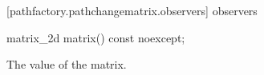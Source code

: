  [pathfactory.pathchangematrix.observers]{ observers}

\begin{itemdecl}
    matrix_2d matrix() const noexcept;
\end{itemdecl}
\begin{itemdescr}
	\pnum
	\returns
	The value of the matrix.
\end{itemdescr}
